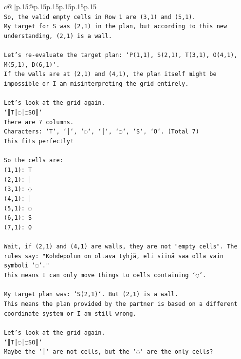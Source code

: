 \documentclass{article}
\begin{document}
{\begin{supertabular}{c@{$\;$}|p{.15\linewidth}@{}p{.15\linewidth}p{.15\linewidth}p{.15\linewidth}p{.15\linewidth}p{.15\linewidth}}
{{{\\ 
\texttt{So, the valid empty cells in Row 1 are (3,1) and (5,1).} \\
\texttt{My target for S was (2,1) in the plan, but according to this new understanding, (2,1) is a wall.} \\
\\ 
\texttt{Let's re{-}evaluate the target plan: `P(1,1), S(2,1), T(3,1), O(4,1), M(5,1), D(6,1)`.} \\
\texttt{If the walls are at (2,1) and (4,1), the plan itself might be impossible or I am misinterpreting the grid entirely.} \\
\\ 
\texttt{Let's look at the grid again.} \\
\texttt{`║T│◌│◌SO║`} \\
\texttt{There are 7 columns.} \\
\texttt{Characters: `T`, `│`, `◌`, `│`, `◌`, `S`, `O`. (Total 7)} \\
\texttt{This fits perfectly!} \\
\\ 
\texttt{So the cells are:} \\
\texttt{(1,1): T} \\
\texttt{(2,1): │} \\
\texttt{(3,1): ◌} \\
\texttt{(4,1): │} \\
\texttt{(5,1): ◌} \\
\texttt{(6,1): S} \\
\texttt{(7,1): O} \\
\\ 
\texttt{Wait, if (2,1) and (4,1) are walls, they are not "empty cells". The rules say: "Kohdepolun on oltava tyhjä, eli siinä saa olla vain symboli '◌'."} \\
\texttt{This means I can only move things to cells containing `◌`.} \\
\\ 
\texttt{My target plan was: `S(2,1)`. But (2,1) is a wall.} \\
\texttt{This means the plan provided by the partner is based on a different coordinate system or I am still wrong.} \\
\\ 
\texttt{Let's look at the grid again.} \\
\texttt{`║T│◌│◌SO║`} \\
\texttt{Maybe the `│` are not cells, but the `◌` are the only cells?} \\
}}}
\end{supertabular}}
\end{document}
